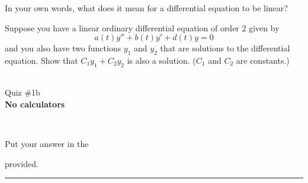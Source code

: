 \documentclass[12pt]{article}
\newcommand{\version}{}
\newcommand{\xzero}{}
\newcommand{\xone}{}
\newcommand{\xtwo}{}
\newcommand{\xthree}{}
\newcommand{\xfour}{}
\newcommand{\xfive}{}
\newcommand{\ExamName}{Quiz \#1\version}
\begin{document}
\begin{enumerate}
  \setcounter{problemnumber}{0}
  \Problem 
  In your own words, what does it mean for a differential equation to be linear?
  
  \vfill
  
  \Problem Suppose you have a linear ordinary differential equation of order 2 given by $$a(t)y''+b(t)y'+d(t)y=0$$ and you also have two functions $y_1$ and $y_2$ that are solutions to the differential equation. Show that $C_1y_1+C_2y_2$ is also a solution. ($C_1$ and $C_2$ are constants.) 
  
  \vfill
  \vfill


\end{enumerate}
\newpage
\renewcommand{\version}{b}
\renewcommand{\xzero}{0.0}
\renewcommand{\xone}{1.4}
\renewcommand{\xtwo}{3.6}
\renewcommand{\xthree}{5.0}
\renewcommand{\xfour}{6.1}
\renewcommand{\xfive}{7.5}
\setcounter{problemnumber}{0}
% 
\begin{minipage}{0.25\linewidth}
  \CourseName\ \Quarter \\
  \ExamName \\[1em]
  \textbf{No calculators}\\[2em]
\end{minipage}
\hfill
\begin{minipage}[t]{0.4\linewidth}
\end{minipage}
\hfill
\begin{minipage}{0.25\linewidth}
  \vspace*{-3.25em}
  \ \hfill
\end{minipage}
\vspace*{-0.45in}

\begin{minipage}{0.45\linewidth}
  Put your answer in the 
  provided.
\end{minipage}
\hfill
\begin{minipage}{0.5\linewidth}

\end{minipage}
\noindent\hspace*{-2em}\rule{\textwidth+4em}{1pt}%
\end{document}
